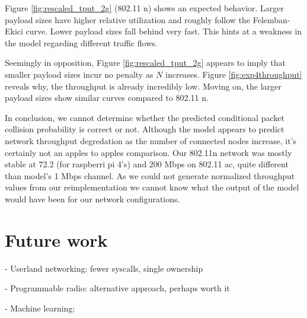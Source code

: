 Figure \ref{fig:rescaled_tput_2g} (802.11 n) shows an expected behavior. Larger
payload sizes have higher relative utilization and roughly follow the
Felemban-Ekici curve. Lower payload sizes fall behind very fast. This hints at
a weakness in the model regarding different traffic flows.

Seemingly in opposition, Figure \ref{fig:rescaled_tput_2g} appears to imply
that smaller payload sizes incur no penalty as $N$ increases. Figure
\ref{fig:exp4throughput} reveals why, the throughput is already incredibly
low. Moving on, the larger payload sizes show similar curves compared to
802.11 n.

In conclusion, we cannot determine whether the predicted conditional packet
collision probability is correct or not. Although the model appears to predict
network throughput degredation as the number of connected nodes increase, it's
certainly not an apples to apples comparison. Our 802.11n network was mostly
stable at 72.2 (for raspberri pi 4's) and 200 Mbps on 802.11 ac, quite
different than model's 1 Mbps channel. As we could not generate normalized
throughput values from our reimplementation we cannot know what the output of
the model would have been for our network configurations.


\section{Future work}

- Userland networking: fewer syscalls, single ownership

- Programmable radio: alternative approach, perhaps worth it

- Machine learning:
